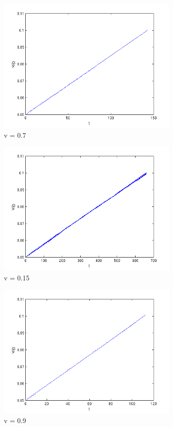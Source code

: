 \documentclass[11pt, twocolumn]{report}
\begin{document}
\begin{figure}
\centering
\includegraphics[width=90mm]{assignment2_images/p2/1.png}
\caption{v = 0.7}
\label{1}
\end{figure}

\begin{figure}
\centering
\includegraphics[width=90mm]{assignment2_images/p2/2.png}
\caption{v = 0.15}
\label{2}
\end{figure}

\begin{figure}
\centering
\includegraphics[width=90mm]{assignment2_images/p2/3.png}
\caption{v = 0.9}
\label{3}
\end{figure}
\end{document}
